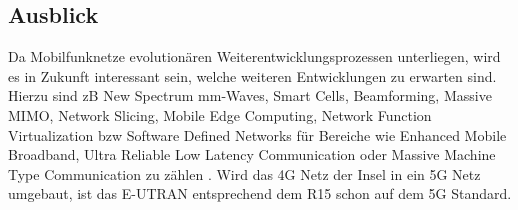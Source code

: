 \subsection{Ausblick}
\label{subsec:ausblick}
Da Mobilfunknetze evolutionären Weiterentwicklungsprozessen unterliegen, wird es in Zukunft interessant sein, welche weiteren Entwicklungen zu erwarten sind. Hierzu sind zB New Spectrum mm-Waves, Smart Cells, Beamforming, Massive MIMO, Network Slicing, Mobile Edge Computing, Network Function Virtualization bzw Software Defined Networks  für Bereiche wie Enhanced Mobile Broadband, Ultra Reliable Low Latency Communication oder Massive Machine Type Communication zu zählen%
. Wird das 4G Netz der Insel in ein 5G Netz umgebaut, ist das E-UTRAN entsprechend dem R15 schon auf dem 5G Standard.